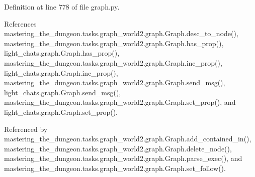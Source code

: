 Definition at line 778 of file graph.\+py.



References mastering\+\_\+the\+\_\+dungeon.\+tasks.\+graph\+\_\+world2.\+graph.\+Graph.\+desc\+\_\+to\+\_\+node(), mastering\+\_\+the\+\_\+dungeon.\+tasks.\+graph\+\_\+world2.\+graph.\+Graph.\+has\+\_\+prop(), light\+\_\+chats.\+graph.\+Graph.\+has\+\_\+prop(), mastering\+\_\+the\+\_\+dungeon.\+tasks.\+graph\+\_\+world2.\+graph.\+Graph.\+inc\+\_\+prop(), light\+\_\+chats.\+graph.\+Graph.\+inc\+\_\+prop(), mastering\+\_\+the\+\_\+dungeon.\+tasks.\+graph\+\_\+world2.\+graph.\+Graph.\+send\+\_\+msg(), light\+\_\+chats.\+graph.\+Graph.\+send\+\_\+msg(), mastering\+\_\+the\+\_\+dungeon.\+tasks.\+graph\+\_\+world2.\+graph.\+Graph.\+set\+\_\+prop(), and light\+\_\+chats.\+graph.\+Graph.\+set\+\_\+prop().



Referenced by mastering\+\_\+the\+\_\+dungeon.\+tasks.\+graph\+\_\+world2.\+graph.\+Graph.\+add\+\_\+contained\+\_\+in(), mastering\+\_\+the\+\_\+dungeon.\+tasks.\+graph\+\_\+world2.\+graph.\+Graph.\+delete\+\_\+node(), mastering\+\_\+the\+\_\+dungeon.\+tasks.\+graph\+\_\+world2.\+graph.\+Graph.\+parse\+\_\+exec(), and mastering\+\_\+the\+\_\+dungeon.\+tasks.\+graph\+\_\+world2.\+graph.\+Graph.\+set\+\_\+follow().

